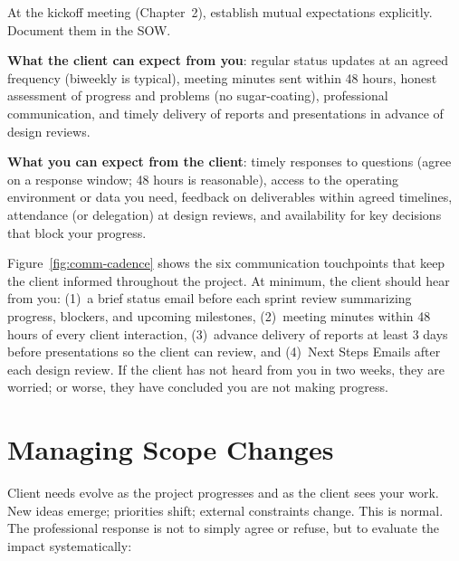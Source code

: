 At the kickoff meeting (Chapter~2), establish mutual expectations explicitly. Document them in the SOW.

\textbf{What the client can expect from you}: regular status updates at an agreed frequency (biweekly is typical), meeting minutes sent within 48 hours, honest assessment of progress and problems (no sugar-coating), professional communication, and timely delivery of reports and presentations in advance of design reviews.

\textbf{What you can expect from the client}: timely responses to questions (agree on a response window; 48 hours is reasonable), access to the operating environment or data you need, feedback on deliverables within agreed timelines, attendance (or delegation) at design reviews, and availability for key decisions that block your progress.

\begin{tipbox}
Figure~\ref{fig:comm-cadence} shows the six communication touchpoints that keep the client informed throughout the project. At minimum, the client should hear from you: (1)~a brief status email before each sprint review summarizing progress, blockers, and upcoming milestones, (2)~meeting minutes within 48 hours of every client interaction, (3)~advance delivery of reports at least 3 days before presentations so the client can review, and (4)~Next Steps Emails after each design review. If the client has not heard from you in two weeks, they are worried; or worse, they have concluded you are not making progress.
\end{tipbox}

\section{Managing Scope Changes}
Client needs evolve as the project progresses and as the client sees your work. New ideas emerge; priorities shift; external constraints change. This is normal. The professional response is not to simply agree or refuse, but to evaluate the impact systematically:


